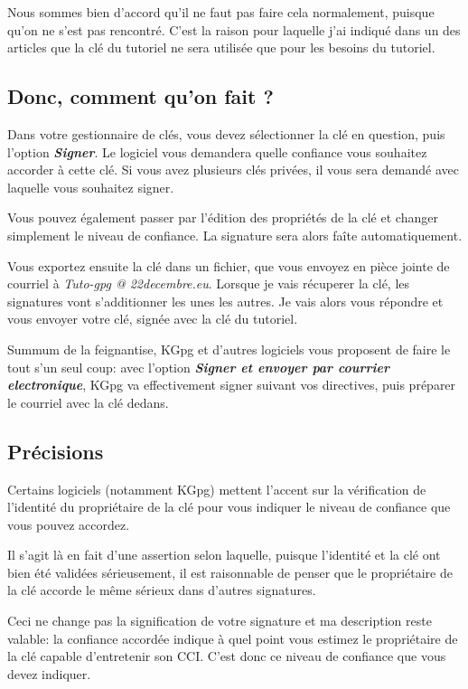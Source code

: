 Nous sommes bien d'accord qu'il ne faut pas faire cela normalement,
puisque qu'on ne s'est pas rencontré. C'est la raison pour laquelle j'ai indiqué dans un des articles que la
clé du tutoriel ne sera utilisée que pour les besoins du tutoriel.

\subsection{Donc, comment qu'on fait ?}\label{donc-comment-quon-fait}

Dans votre gestionnaire de clés, vous devez sélectionner la clé en
question, puis l'option \textbf{\emph{Signer}}. Le logiciel vous demandera quelle confiance vous souhaitez accorder à
cette clé. Si vous avez plusieurs clés privées, il vous sera demandé
avec laquelle vous souhaitez signer.

Vous pouvez également passer par l'édition des propriétés de la clé et
changer simplement le niveau de confiance. La signature sera alors faîte
automatiquement.

Vous exportez ensuite la clé dans un fichier, que vous envoyez en pièce
jointe de courriel à \emph{Tuto-gpg @ 22decembre.eu}. Lorsque je vais
récuperer la clé, les signatures vont s'additionner les unes les autres.
Je vais alors vous répondre et vous envoyer votre clé, signée avec la
clé du tutoriel.

Summum de la feignantise, KGpg et d'autres logiciels vous proposent de
faire le tout s'un seul coup: avec l'option \textbf{\emph{Signer et
envoyer par courrier electronique}}, KGpg va effectivement signer
suivant vos directives, puis préparer le courriel avec la clé dedans.

\subsection{Précisions}\label{pruxe9cisions}

Certains logiciels (notamment KGpg) mettent l'accent sur la vérification
de l'identité du propriétaire de la clé pour vous indiquer le niveau de
confiance que vous pouvez accordez.

Il s'agit là en fait d'une assertion selon laquelle, puisque l'identité
et la clé ont bien été validées sérieusement, il est raisonnable de
penser que le propriétaire de la clé accorde le même sérieux dans
d'autres signatures.

Ceci ne change pas la signification de votre signature et ma description
reste valable: la confiance accordée indique à quel point vous estimez
le propriétaire de la clé capable d'entretenir son CCI. C'est donc ce niveau de confiance que vous devez indiquer.